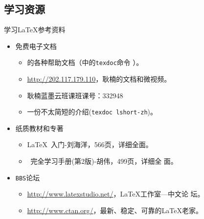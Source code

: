 \documentclass[xcolor=svgnames, t, aspectratio=169]{ctexbeamer}
\begin{document}
\subsection{学习资源}
\begin{frame}[t]{学习\LaTeX}{参考资料}
  \stretchon
  \begin{itemize}
  \item \alert{免费}电子文档
    \begin{itemize}
    \item \TeXLive 的各种帮助文档（\TeXLive 中的\alert{\texttt{texdoc}}命令
      ）。
    \item \url{http://202.117.179.110}，耿楠的文档和微视频。
    \item 耿楠蓝墨云班课班课号：332948
    \item 一份不太简短的{\LaTeXe}介绍(\texttt{texdoc lshort-zh})。
    \end{itemize}
  \item 纸质教材和专著
    \begin{itemize}
    \item {\LaTeX}~入门-刘海洋，566页，详细全面。
    \item {\LaTeXe}~完全学习手册(第2版)-胡伟，499页，详细全
      面。
    \end{itemize}
  \item \texttt{BBS}论坛
    \begin{itemize}
    \item \url{http://www.latexstudio.net/}，{\LaTeX}工作室---中文论
      坛。  
    \item \url{http://www.ctan.org/}，最新、稳定、可靠的{\LaTeX}老家。    
    \end{itemize}
  \end{itemize}
  \stretchoff
\end{frame}
\end{document}
